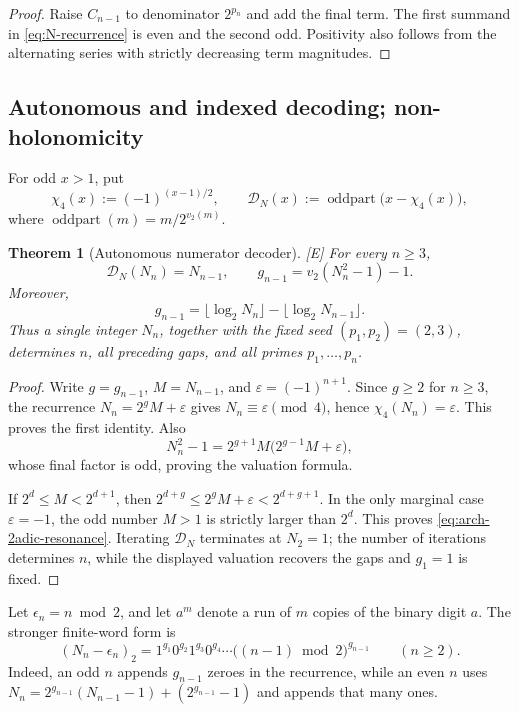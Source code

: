 \documentclass[11pt]{article}
\newtheorem{theorem}{Theorem}[section]
\theoremstyle{definition}
\theoremstyle{remark}
\newcommand{\status}[1]{\textnormal{\textcolor{accent}{\footnotesize[#1]}}}
\DeclareMathOperator{\oddpart}{oddpart}
\begin{document}
\begin{proof}
Raise $C_{n-1}$ to denominator $2^{p_n}$ and add the final term.  The first summand in
\eqref{eq:N-recurrence} is even and the second odd.  Positivity also follows from the
alternating series with strictly decreasing term magnitudes.
\end{proof}

\subsection{Autonomous and indexed decoding; non-holonomicity}

For odd $x>1$, put
\[
 \chi_4(x):=(-1)^{(x-1)/2},
 \qquad
 \mathscr D_N(x):=\oddpart\!\bigl(x-\chi_4(x)\bigr),
\]
where $\oddpart(m)=m/2^{v_2(m)}$.

\begin{theorem}[Autonomous numerator decoder]
\label{thm:autonomous-N-decoder}
\status{E}
For every $n\ge3$,
\begin{equation}\label{eq:autonomous-N-decoder}
 \mathscr D_N(N_n)=N_{n-1},
 \qquad
 g_{n-1}=v_2(N_n^2-1)-1.
\end{equation}
Moreover,
\begin{equation}\label{eq:arch-2adic-resonance}
 g_{n-1}=\lfloor\log_2N_n\rfloor-\lfloor\log_2N_{n-1}\rfloor.
\end{equation}
Thus a single integer $N_n$, together with the fixed seed
$(p_1,p_2)=(2,3)$, determines $n$, all preceding gaps, and all primes
$p_1,\ldots,p_n$.
\end{theorem}

\begin{proof}
Write $g=g_{n-1}$, $M=N_{n-1}$, and $\varepsilon=(-1)^{n+1}$.  Since
$g\ge2$ for $n\ge3$, the recurrence $N_n=2^gM+\varepsilon$ gives
$N_n\equiv\varepsilon\pmod4$, hence $\chi_4(N_n)=\varepsilon$.  This proves the
first identity.  Also
\[
 N_n^2-1=2^{g+1}M\bigl(2^{g-1}M+\varepsilon\bigr),
\]
whose final factor is odd, proving the valuation formula.

If $2^d\le M<2^{d+1}$, then
$2^{d+g}\le2^gM+\varepsilon<2^{d+g+1}$.  In the only marginal case
$\varepsilon=-1$, the odd number $M>1$ is strictly larger than $2^d$.
This proves \eqref{eq:arch-2adic-resonance}.  Iterating $\mathscr D_N$ terminates at
$N_2=1$; the number of iterations determines $n$, while the displayed valuation
recovers the gaps and $g_1=1$ is fixed.
\end{proof}

Let $\epsilon_n=n\bmod2$, and let $a^m$ denote a run of $m$ copies of the binary
digit $a$.  The stronger finite-word form is
\begin{equation}\label{eq:N-binary-hologram}
 (N_n-\epsilon_n)_2
 =1^{g_1}0^{g_2}1^{g_3}0^{g_4}\cdots
 \bigl((n-1)\bmod2\bigr)^{g_{n-1}}\qquad(n\ge2).
\end{equation}
Indeed, an odd $n$ appends $g_{n-1}$ zeroes in the recurrence, while an even $n$
uses
$N_n=2^{g_{n-1}}(N_{n-1}-1)+(2^{g_{n-1}}-1)$ and appends that many ones.
\end{document}
